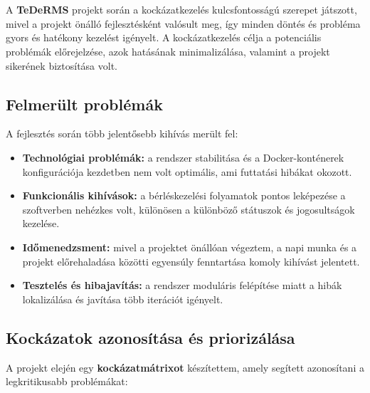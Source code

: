 \chapter{\riskproblem}

A \textbf{TeDeRMS} projekt során a kockázatkezelés kulcsfontosságú szerepet játszott, 
mivel a projekt önálló fejlesztésként valósult meg, így minden döntés és probléma gyors és hatékony kezelést igényelt. 
A kockázatkezelés célja a potenciális problémák előrejelzése, azok hatásának minimalizálása, 
valamint a projekt sikerének biztosítása volt.

\section{Felmerült problémák}

A fejlesztés során több jelentősebb kihívás merült fel:
\begin{itemize}
    \item \textbf{Technológiai problémák:} a rendszer stabilitása és a Docker-konténerek konfigurációja kezdetben nem volt optimális, ami futtatási hibákat okozott.
    \item \textbf{Funkcionális kihívások:} a bérléskezelési folyamatok pontos leképezése a szoftverben nehézkes volt, különösen a különböző státuszok és jogosultságok kezelése.
    \item \textbf{Időmenedzsment:} mivel a projektet önállóan végeztem, a napi munka és a projekt előrehaladása közötti egyensúly fenntartása komoly kihívást jelentett.
    \item \textbf{Tesztelés és hibajavítás:} a rendszer moduláris felépítése miatt a hibák lokalizálása és javítása több iterációt igényelt.
\end{itemize}

\section{Kockázatok azonosítása és priorizálása}

A projekt elején egy \textbf{kockázatmátrixot} készítettem, amely segített azonosítani a legkritikusabb problémákat:

